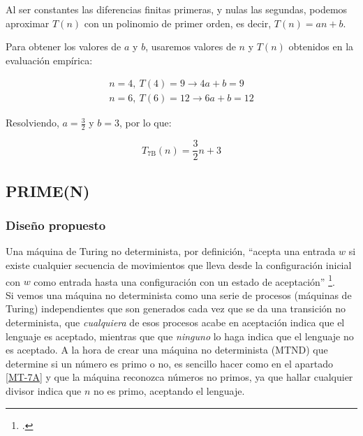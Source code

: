 Al ser constantes las diferencias finitas primeras, y nulas las segundas, podemos aproximar $T(n)$ con un polinomio de primer orden, es decir, $T(n) = an + b$.\medskip

Para obtener los valores de $a$ y $b$, usaremos valores de $n$ y $T(n)$ obtenidos en la evaluación empírica:

\begin{subequations}
    \begin{gather*}
        n = 4,\ T(4) = 9  \rightarrow 4a + b = 9 \\
        n = 6,\ T(6) = 12 \rightarrow 6a + b = 12
    \end{gather*}
\end{subequations}


Resolviendo, $a=\frac{3}{2}$ y $b=3$, por lo que:

\begin{equation}
    T_{\mathrm{7B}}(n) = \frac{3}{2}n + 3
\end{equation}




\subsection{PRIME(N)}

\subsubsection*{Diseño propuesto}
Una máquina de Turing no determinista, por definición, ``acepta una
entrada $w$ si existe cualquier secuencia de movimientos que lleva desde la configuración inicial con $w$ como entrada hasta una configuración con un estado de aceptación''
\footcite[ver][pg. 289]{HopcroftJohnE.2008Ialt}.\\
Si vemos una máquina no determinista como una serie de procesos (máquinas de Turing) independientes que son generados cada vez que se da una transición no determinista, que \textit{cualquiera} de esos procesos acabe en aceptación indica que el lenguaje es aceptado, mientras que que \textit{ninguno} lo haga indica que el lenguaje no es aceptado. A la hora de crear una máquina no determinista (MTND) que determine si un número es primo o no, es sencillo hacer como en el apartado \ref{MT-7A} y que la máquina reconozca números no primos, ya que hallar cualquier divisor indica que $n$ no es primo, aceptando el lenguaje.\medskip

